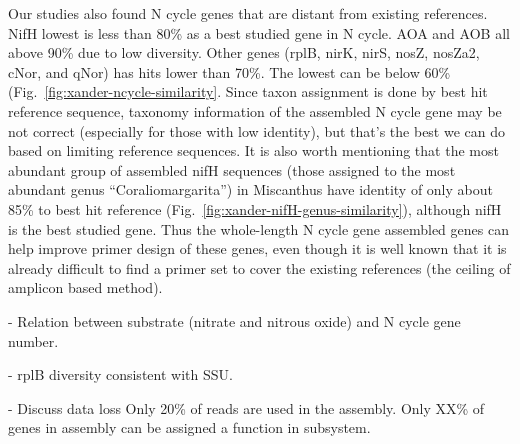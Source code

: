 \documentclass[12pt]{article}
\begin{document}
Our studies also found N cycle genes that are distant from existing references. NifH lowest is less than 80\% as a best studied gene in N cycle. AOA and AOB all above 90\% due to low diversity. Other genes (rplB, nirK, nirS, nosZ, nosZa2, cNor, and qNor) has hits lower than 70\%. The lowest can be below 60\% (Fig.~\ref{fig:xander-ncycle-similarity}. Since taxon assignment is done by best hit reference sequence, taxonomy information of the assembled N cycle gene may be not correct (especially for those with low identity), but that's the best we can do based on limiting reference sequences. It is also worth mentioning that the most abundant group of assembled nifH sequences (those assigned to the most abundant genus ``Coraliomargarita'') in Miscanthus have identity of only about 85\% to best hit reference (Fig.~\ref{fig:xander-nifH-genus-similarity}), although nifH is the best studied gene. Thus the whole-length N cycle gene assembled genes can help improve primer design of these genes, even though it is well known that it is already difficult to find a primer set to cover the existing references (the ceiling of amplicon based method).

- Relation between substrate (nitrate and nitrous oxide) and N cycle gene number.

- rplB diversity consistent with SSU. 


- Discuss data loss
Only 20\% of reads are used in the assembly. Only XX\% of genes in assembly can be assigned a function in subsystem.
\end{document}
